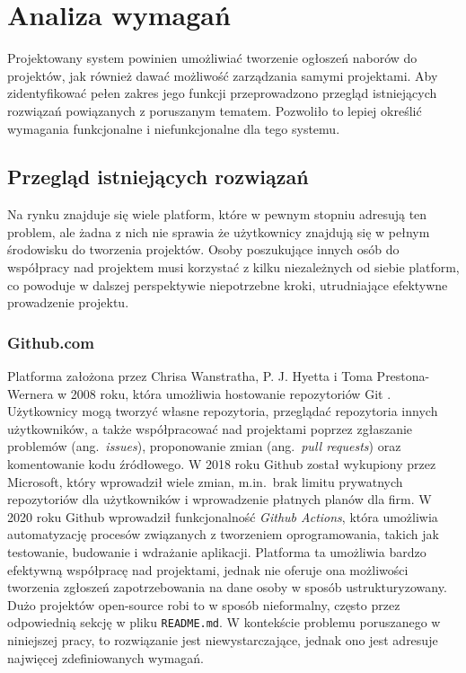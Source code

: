 \chapter{Analiza wymagań}
Projektowany system powinien umożliwiać tworzenie ogłoszeń naborów do projektów, jak również dawać możliwość zarządzania samymi projektami. Aby zidentyfikować pełen zakres jego funkcji przeprowadzono przegląd istniejących rozwiązań powiązanych z poruszanym tematem. Pozwoliło to lepiej określić wymagania funkcjonalne i niefunkcjonalne dla tego systemu.

\section{Przegląd istniejących rozwiązań}
Na rynku znajduje się wiele platform, które w pewnym stopniu adresują ten problem, ale żadna z nich nie sprawia że użytkownicy znajdują się w pełnym środowisku do tworzenia projektów.
Osoby poszukujące innych osób do współpracy nad projektem musi korzystać z kilku niezależnych od siebie platform, co powoduje w dalszej perspektywie niepotrzebne kroki, utrudniające efektywne prowadzenie projektu.

\subsection{Github.com}

Platforma założona przez Chrisa Wanstratha, P. J. Hyetta i Toma Prestona-Wernera w 2008 roku, która umożliwia hostowanie repozytoriów Git \cite{GitHub}. Użytkownicy mogą tworzyć własne repozytoria, przeglądać repozytoria innych użytkowników,
a także współpracować nad projektami poprzez zgłaszanie problemów (ang.~\emph{issues}), proponowanie zmian (ang.~\emph{pull requests}) oraz komentowanie kodu źródłowego.
W 2018 roku Github został wykupiony przez Microsoft, który wprowadził wiele zmian, m.in.\ brak limitu prywatnych repozytoriów dla użytkowników i wprowadzenie płatnych planów dla firm. W 2020 roku Github wprowadził funkcjonalność \emph{Github Actions}, która umożliwia automatyzację procesów związanych z tworzeniem oprogramowania, takich jak testowanie, budowanie i wdrażanie aplikacji.
Platforma ta umożliwia bardzo efektywną współpracę nad projektami, jednak nie oferuje ona możliwości tworzenia zgłoszeń zapotrzebowania na dane osoby w sposób ustrukturyzowany. Dużo projektów open-source
robi to w sposób nieformalny, często przez odpowiednią sekcję w pliku \texttt{README.md}. W kontekście problemu poruszanego w niniejszej pracy, to rozwiązanie jest niewystarczające, jednak ono jest adresuje najwięcej zdefiniowanych wymagań.


